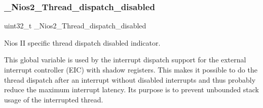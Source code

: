 \subsubsection{\texorpdfstring{\_Nios2\_Thread\_dispatch\_disabled}{\_Nios2\_Thread\_dispatch\_disabled}}
{\footnotesize\ttfamily uint32\+\_\+t \+\_\+\+Nios2\+\_\+\+Thread\+\_\+dispatch\+\_\+disabled}



Nios II specific thread dispatch disabled indicator. 

This global variable is used by the interrupt dispatch support for the external interrupt controller (E\+IC) with shadow registers. This makes it possible to do the thread dispatch after an interrupt without disabled interrupts and thus probably reduce the maximum interrupt latency. Its purpose is to prevent unbounded stack usage of the interrupted thread. 